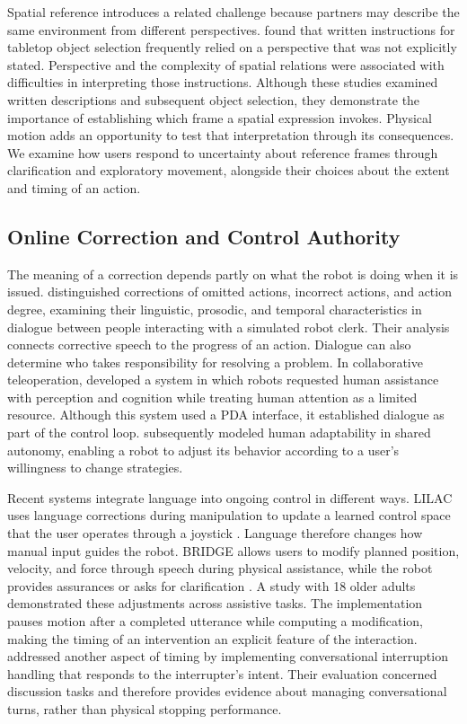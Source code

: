 Spatial reference introduces a related challenge because partners may describe the same environment from different perspectives. \citet{li2016spatial} found that written instructions for tabletop object selection frequently relied on a perspective that was not explicitly stated. Perspective and the complexity of spatial relations were associated with difficulties in interpreting those instructions. Although these studies examined written descriptions and subsequent object selection, they demonstrate the importance of establishing which frame a spatial expression invokes. Physical motion adds an opportunity to test that interpretation through its consequences. We examine how users respond to uncertainty about reference frames through clarification and exploratory movement, alongside their choices about the extent and timing of an action.

\subsection{Online Correction and Control Authority}

The meaning of a correction depends partly on what the robot is doing when it is issued. \citet{raux2010corrections} distinguished corrections of omitted actions, incorrect actions, and action degree, examining their linguistic, prosodic, and temporal characteristics in dialogue between people interacting with a simulated robot clerk. Their analysis connects corrective speech to the progress of an action. Dialogue can also determine who takes responsibility for resolving a problem. In collaborative teleoperation, \citet{fong2003questions} developed a system in which robots requested human assistance with perception and cognition while treating human attention as a limited resource. Although this system used a PDA interface, it established dialogue as part of the control loop. \citet{nikolaidis2017mutual} subsequently modeled human adaptability in shared autonomy, enabling a robot to adjust its behavior according to a user's willingness to change strategies.

Recent systems integrate language into ongoing control in different ways. LILAC uses language corrections during manipulation to update a learned control space that the user operates through a joystick \citep{cui2023lilac}. Language therefore changes how manual input guides the robot. BRIDGE allows users to modify planned position, velocity, and force through speech during physical assistance, while the robot provides assurances or asks for clarification \citep{wang2026bridge}. A study with 18 older adults demonstrated these adjustments across assistive tasks. The implementation pauses motion after a completed utterance while computing a modification, making the timing of an intervention an explicit feature of the interaction. \citet{cao2025interruption} addressed another aspect of timing by implementing conversational interruption handling that responds to the interrupter's intent. Their evaluation concerned discussion tasks and therefore provides evidence about managing conversational turns, rather than physical stopping performance.

